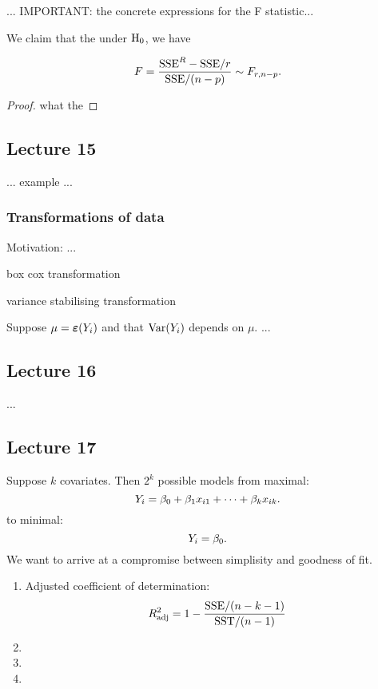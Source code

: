 ... IMPORTANT: the concrete expressions for the F statistic...

We claim that the under $\mathrm{H}_0$, we have

$$
    F = \frac{\mathrm{SSE}^R-\mathrm{SSE} / r}{\mathrm{SSE}/(n-p)} \sim F_{r, n-p}.
$$

\begin{proof}
    
    what the

\end{proof}




\subsection*{Lecture 15}


... example ...


\subsubsection*{Transformations of data}
Motivation:
...


box cox transformation
 

variance stabilising transformation

Suppose $\mu=\boldsymbol{\varepsilon}(Y_i)$ and that $\mathrm{Var}(Y_i)$ depends on $\mu$. ...

 

\subsection*{Lecture 16}

...






\subsection*{Lecture 17}
Suppose $k$ covariates. Then $2^k$ possible models from maximal:
$$
    Y_i = \beta_0+\beta_1x_{i1} + \dots + \beta_kx_{ik}.
$$
to minimal:
$$
    Y_i = \beta_0.
$$
We want to arrive at a compromise between simplisity and goodness of fit. 

\begin{enumerate}
    \item Adjusted coefficient of determination:
    $$
        R^2_{\mathrm{adj}} = 1 - \frac{\mathrm{SSE} / (n-k-1)}{\mathrm{SST} / (n-1)}
    $$
    \item 
    \item 
    \item 
\end{enumerate}
  


